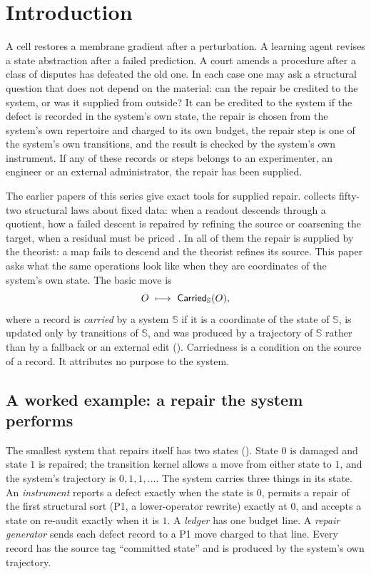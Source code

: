 \section{Introduction}\label{sec:intro}

A cell restores a membrane gradient after a perturbation. A learning agent revises a state
abstraction after a failed prediction. A court amends a procedure after a class of disputes has
defeated the old one. In each case one may ask a structural question that does not depend on the
material: can the repair be credited to the system, or was it supplied from outside? It can be
credited to the system if the defect is recorded in the system's own state, the repair is chosen from
the system's own repertoire and charged to its own budget, the repair step is one of the system's own
transitions, and the result is checked by the system's own instrument. If any of these records or
steps belongs to an experimenter, an engineer or an external administrator, the repair has been
supplied.

The earlier papers of this series give exact tools for supplied repair. \FoundIV{} collects
fifty-two structural laws about fixed data: when a readout descends through a quotient, how a
failed descent is repaired by refining the source or coarsening the target, when a residual must be
priced \citep{Tsiokos2026FoundIV}. In all of them the repair is supplied by the theorist: a map
fails to descend and the theorist refines its source. This paper asks what the same operations look
like when they are coordinates of the system's own state. The basic move is
\[
  O \ \longmapsto\ \Carried_{\mathbb S}(O),
\]
where a record is \emph{carried} by a system $\mathbb S$ if it is a coordinate of the state of
$\mathbb S$, is updated only by transitions of $\mathbb S$, and was produced by a trajectory of
$\mathbb S$ rather than by a fallback or an external edit (). Carriedness is a
condition on the source of a record. It attributes no purpose to the system.

\subsection{A worked example: a repair the system performs}\label{sec:intro-example}

The smallest system that repairs itself has two states (). State $0$ is damaged and state $1$ is
repaired; the transition kernel allows a move from either state to $1$, and the system's trajectory
is $0, 1, 1, \dots$. The system carries three things in its state. An \emph{instrument} reports a
defect exactly when the state is $0$, permits a repair of the first structural sort (P1, a
lower-operator rewrite) exactly at $0$, and accepts a state on re-audit exactly when it is $1$. A
\emph{ledger} has one budget line. A \emph{repair generator} sends each defect record to a P1 move
charged to that line. Every record has the source tag ``committed state'' and is produced by the
system's own trajectory.

